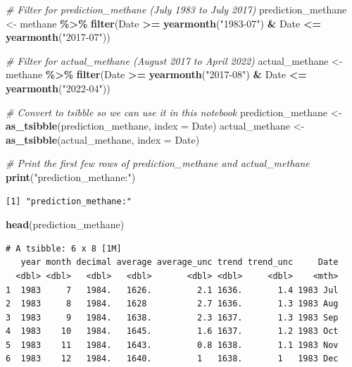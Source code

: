 \documentclass[
]{article}
\newenvironment{Shaded}{\begin{snugshade}}{\end{snugshade}}
\newcommand{\AttributeTok}[1]{\textcolor[rgb]{0.13,0.29,0.53}{#1}}
\newcommand{\CommentTok}[1]{\textcolor[rgb]{0.56,0.35,0.01}{\textit{#1}}}
\newcommand{\FunctionTok}[1]{\textcolor[rgb]{0.13,0.29,0.53}{\textbf{#1}}}
\newcommand{\NormalTok}[1]{#1}
\newcommand{\OtherTok}[1]{\textcolor[rgb]{0.56,0.35,0.01}{#1}}
\newcommand{\SpecialCharTok}[1]{\textcolor[rgb]{0.81,0.36,0.00}{\textbf{#1}}}
\newcommand{\StringTok}[1]{\textcolor[rgb]{0.31,0.60,0.02}{#1}}
\begin{document}
\begin{Shaded}
\begin{Highlighting}[]
\CommentTok{\# Filter for prediction\_methane (July 1983 to July 2017)}
\NormalTok{prediction\_methane }\OtherTok{\textless{}{-}}\NormalTok{ methane }\SpecialCharTok{\%\textgreater{}\%}
  \FunctionTok{filter}\NormalTok{(Date }\SpecialCharTok{\textgreater{}=} \FunctionTok{yearmonth}\NormalTok{(}\StringTok{"1983{-}07"}\NormalTok{) }\SpecialCharTok{\&}\NormalTok{ Date }\SpecialCharTok{\textless{}=} \FunctionTok{yearmonth}\NormalTok{(}\StringTok{"2017{-}07"}\NormalTok{))}

\CommentTok{\# Filter for actual\_methane (August 2017 to April 2022)}
\NormalTok{actual\_methane }\OtherTok{\textless{}{-}}\NormalTok{ methane }\SpecialCharTok{\%\textgreater{}\%}
  \FunctionTok{filter}\NormalTok{(Date }\SpecialCharTok{\textgreater{}=} \FunctionTok{yearmonth}\NormalTok{(}\StringTok{"2017{-}08"}\NormalTok{) }\SpecialCharTok{\&}\NormalTok{ Date }\SpecialCharTok{\textless{}=} \FunctionTok{yearmonth}\NormalTok{(}\StringTok{"2022{-}04"}\NormalTok{))}

\CommentTok{\# Convert to tsibble so we can use it in this notebook}
\NormalTok{prediction\_methane }\OtherTok{\textless{}{-}} \FunctionTok{as\_tsibble}\NormalTok{(prediction\_methane, }\AttributeTok{index =}\NormalTok{ Date)}
\NormalTok{actual\_methane }\OtherTok{\textless{}{-}} \FunctionTok{as\_tsibble}\NormalTok{(actual\_methane, }\AttributeTok{index =}\NormalTok{ Date)}

\CommentTok{\# Print the first few rows of prediction\_methane and actual\_methane}
\FunctionTok{print}\NormalTok{(}\StringTok{"prediction\_methane:"}\NormalTok{)}
\end{Highlighting}
\end{Shaded}

\begin{verbatim}
[1] "prediction_methane:"
\end{verbatim}

\begin{Shaded}
\begin{Highlighting}[]
\FunctionTok{head}\NormalTok{(prediction\_methane)}
\end{Highlighting}
\end{Shaded}

\begin{verbatim}
# A tsibble: 6 x 8 [1M]
   year month decimal average average_unc trend trend_unc     Date
  <dbl> <dbl>   <dbl>   <dbl>       <dbl> <dbl>     <dbl>    <mth>
1  1983     7   1984.   1626.         2.1 1636.       1.4 1983 Jul
2  1983     8   1984.   1628          2.7 1636.       1.3 1983 Aug
3  1983     9   1984.   1638.         2.3 1637.       1.3 1983 Sep
4  1983    10   1984.   1645.         1.6 1637.       1.2 1983 Oct
5  1983    11   1984.   1643.         0.8 1638.       1.1 1983 Nov
6  1983    12   1984.   1640.         1   1638.       1   1983 Dec
\end{verbatim}
\end{document}
